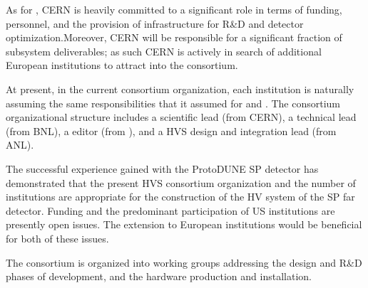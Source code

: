  
 As %
for , CERN is heavily committed to a significant role in terms of funding, personnel, 
 and the provision of infrastructure for R\&D and detector optimization.Moreover, CERN will be responsible for a significant fraction of subsystem deliverables; as such  CERN is actively in search of additional European institutions to attract into the consortium. 
 
At present, in the  current consortium organization, each institution is naturally assuming the same responsibilities that it assumed for %
 and . The %
consortium organizational structure includes a scientific lead (from CERN), a technical lead (from BNL), a  editor (from \fnal), and a HVS design and integration lead (from ANL). 

The successful experience gained with the ProtoDUNE SP detector has demonstrated that the present HVS consortium organization and the number of institutions are appropriate for the construction of the HV system of the SP far detector. Funding and the predominant participation of US institutions are presently open issues. The extension to European institutions would be beneficial for both of these issues.

 The consortium is organized into working groups addressing the design and  R\&D phases of development, and the hardware production and installation.

